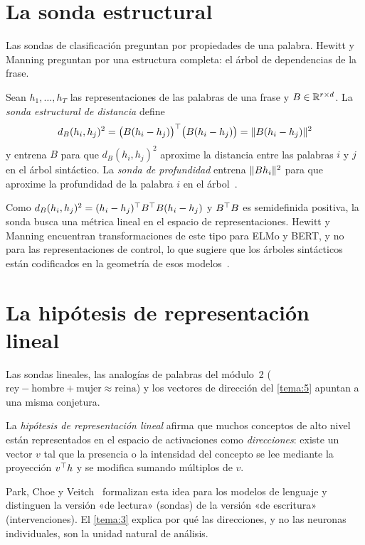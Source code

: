 \section{La sonda estructural}

Las sondas de clasificación preguntan por propiedades de una palabra. Hewitt y Manning preguntan por una estructura completa: el árbol de dependencias de la frase.

\begin{definicion}\label{def:estructural}
Sean $h_1,\dots,h_T$ las representaciones de las palabras de una frase y $B\in\mathbb{R}^{r\times d}$. La \emph{sonda estructural de distancia} define
\[
d_B(h_i,h_j)^{2}=\bigl(B(h_i-h_j)\bigr)^{\top}\bigl(B(h_i-h_j)\bigr)=\lVert B(h_i-h_j)\rVert^{2}
\]
y entrena $B$ para que $d_B(h_i,h_j)^2$ aproxime la distancia entre las palabras $i$ y $j$ en el árbol sintáctico. La \emph{sonda de profundidad} entrena $\lVert Bh_i\rVert^{2}$ para que aproxime la profundidad de la palabra $i$ en el árbol~\cite{hewitt-manning}.
\end{definicion}

Como $d_B(h_i,h_j)^2=(h_i-h_j)^{\top} B^{\top} B(h_i-h_j)$ y $B^{\top} B$ es semidefinida positiva, la sonda busca una métrica lineal en el espacio de representaciones. Hewitt y Manning encuentran transformaciones de este tipo para ELMo y BERT, y no para las representaciones de control, lo que sugiere que los árboles sintácticos están codificados en la geometría de esos modelos~\cite{hewitt-manning}.

\section{La hipótesis de representación lineal}

Las sondas lineales, las analogías de palabras del módulo~2 ($\text{rey}-\text{hombre}+\text{mujer}\approx\text{reina}$) y los vectores de dirección del \cref{tema:5} apuntan a una misma conjetura.

\begin{definicion}\label{def:hrl}
La \emph{hipótesis de representación lineal} afirma que muchos conceptos de alto nivel están representados en el espacio de activaciones como \emph{direcciones}: existe un vector $v$ tal que la presencia o la intensidad del concepto se lee mediante la proyección $v^{\top} h$ y se modifica sumando múltiplos de $v$.
\end{definicion}

Park, Choe y Veitch~\cite{park} formalizan esta idea para los modelos de lenguaje y distinguen la versión «de lectura» (sondas) de la versión «de escritura» (intervenciones). El \cref{tema:3} explica por qué las direcciones, y no las neuronas individuales, son la unidad natural de análisis.

